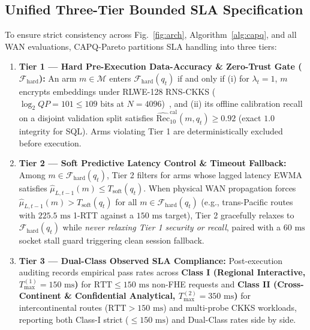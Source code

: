 \documentclass[10pt,journal,compsoc]{IEEEtran}
\begin{document}
\subsection{Unified Three-Tier Bounded SLA Specification}
To ensure strict consistency across Fig.~\ref{fig:arch}, Algorithm~\ref{alg:capq}, and all WAN evaluations, CAPQ-Pareto partitions SLA handling into three tiers:
\begin{enumerate}
    \item \textbf{Tier 1 — Hard Pre-Execution Data-Accuracy \& Zero-Trust Gate ($\mathcal{F}_{\text{hard}}$):} An arm $m \in \mathcal{M}$ enters $\mathcal{F}_{\text{hard}}(q_t)$ if and only if (i) for $\lambda_t=1$, $m$ encrypts embeddings under RLWE-128 RNS-CKKS ($\log_2 QP = 101 \le 109\text{ bits}$ at $N=4096$)~\cite{he_standard_2018}, and (ii) its offline calibration recall on a disjoint validation split satisfies $\widehat{\text{Rec}}_{10}^{\text{cal}}(m, q_t) \ge 0.92$ (exact $1.0$ integrity for SQL). Arms violating Tier 1 are deterministically excluded before execution.
    \item \textbf{Tier 2 — Soft Predictive Latency Control \& Timeout Fallback:} Among $m \in \mathcal{F}_{\text{hard}}(q_t)$, Tier 2 filters for arms whose lagged latency EWMA satisfies $\hat{\mu}_{L,t-1}(m) \le T_{\text{soft}}(q_t)$. When physical WAN propagation forces $\hat{\mu}_{L,t-1}(m) > T_{\text{soft}}(q_t)$ for all $m \in \mathcal{F}_{\text{hard}}(q_t)$ (e.g., trans-Pacific routes with $225.5\text{ ms}$ 1-RTT against a $150\text{ ms}$ target), Tier 2 gracefully relaxes to $\mathcal{F}_{\text{hard}}(q_t)$ while \emph{never relaxing Tier 1 security or recall}, paired with a $60\text{ ms}$ socket stall guard triggering clean session fallback.
    \item \textbf{Tier 3 — Dual-Class Observed SLA Compliance:} Post-execution auditing records empirical pass rates across \textbf{Class I (Regional Interactive, $T_{\max}^{(1)}=150\text{ ms}$)} for $\text{RTT} \le 150\text{ ms}$ non-FHE requests and \textbf{Class II (Cross-Continent \& Confidential Analytical, $T_{\max}^{(2)}=350\text{ ms}$)} for intercontinental routes ($\text{RTT}>150\text{ ms}$) and multi-probe CKKS workloads, reporting both Class-I strict ($\le 150\text{ ms}$) and Dual-Class rates side by side.
\end{enumerate}
\end{document}
